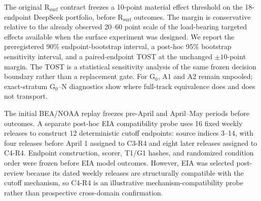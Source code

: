 The original R$_{\mathrm{surf}}$ contract freezes a 10-point material effect threshold on the 18-endpoint DeepSeek portfolio, before R$_{\mathrm{surf}}$ outcomes. The margin is conservative relative to the already observed 20--60 point scale of the load-bearing targeted effects available when the surface experiment was designed. We report the preregistered 90\% endpoint-bootstrap interval, a post-hoc 95\% bootstrap sensitivity interval, and a paired-endpoint TOST at the unchanged $\pm10$-point margin. The TOST is a statistical sensitivity analysis of the same frozen decision boundary rather than a replacement gate. For G$_0$, A1 and A2 remain unpooled; exact-stratum G$_0$--N diagnostics show where full-track equivalence does and does not transport.

The initial BEA/NOAA replay freezes pre-April and April--May periods before outcomes. A separate post-hoc EIA compatibility probe uses 16 fixed weekly releases to construct 12 deterministic cutoff endpoints: source indices 3--14, with four releases before April 1 assigned to C3-R4 and eight later releases assigned to C4-R4. Endpoint construction, scorer, T1/G1 hashes, and randomized condition order were frozen before EIA model outcomes. However, EIA was selected post-review because its dated weekly releases are structurally compatible with the cutoff mechanism, so C4-R4 is an illustrative mechanism-compatibility probe rather than prospective cross-domain confirmation.
